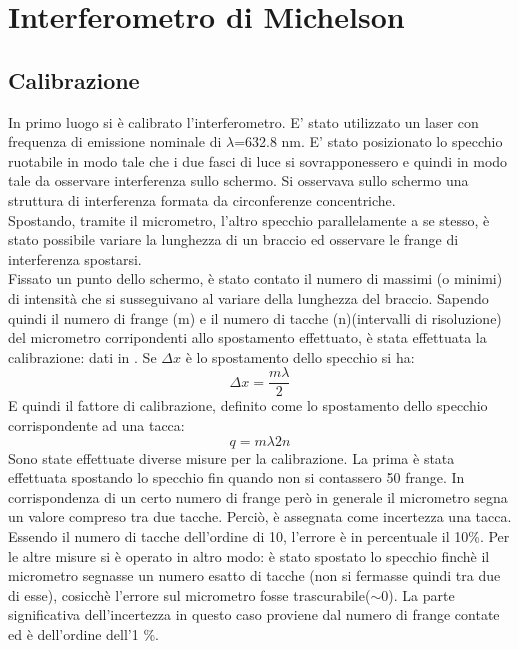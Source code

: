 \section{Interferometro di Michelson}
\subsection{Calibrazione}
In primo luogo si è calibrato l'interferometro. E' stato utilizzato un laser con frequenza di emissione nominale di $\lambda$=632.8 nm. 
E' stato posizionato lo specchio ruotabile in modo tale che i due fasci di luce si sovrapponessero e quindi in modo tale da osservare interferenza sullo schermo.
Si osservava sullo schermo una struttura di interferenza formata da circonferenze concentriche. \\
Spostando, tramite il micrometro, l'altro specchio parallelamente a se stesso, è stato possibile variare la lunghezza di un braccio ed osservare le frange di interferenza spostarsi.\\
Fissato un punto dello schermo, è stato contato il numero di massimi (o minimi) di intensità che si susseguivano al variare della lunghezza del braccio. Sapendo quindi il numero di frange (m) e il numero di tacche (n)(intervalli di risoluzione) del micrometro corripondenti allo spostamento effettuato, è stata effettuata la calibrazione: dati in . Se $\Delta x$ è lo spostamento dello specchio si ha:
\begin{equation}
\Delta x = \frac{m\lambda}{2}
\end{equation}
E quindi il fattore di calibrazione, definito come lo spostamento dello specchio corrispondente ad una tacca:
\begin{equation}
q={m\lambda}{2n}
\end{equation}
Sono state effettuate diverse misure per la calibrazione. La prima è stata effettuata spostando lo specchio fin quando non si contassero 50 frange. In corrispondenza di un certo numero di frange però in generale il micrometro segna un valore compreso tra due tacche. Perciò, è assegnata come incertezza una tacca. Essendo il numero di tacche dell'ordine di 10, l'errore è in percentuale il 10\%. Per le altre misure si è operato in altro modo: è stato spostato lo specchio finchè il micrometro segnasse un numero esatto di tacche (non si fermasse quindi tra due di esse), cosicchè l'errore sul micrometro fosse trascurabile($\sim$0). La parte significativa dell'incertezza in questo caso proviene dal numero di frange contate ed è dell'ordine dell'1 \%.\\
